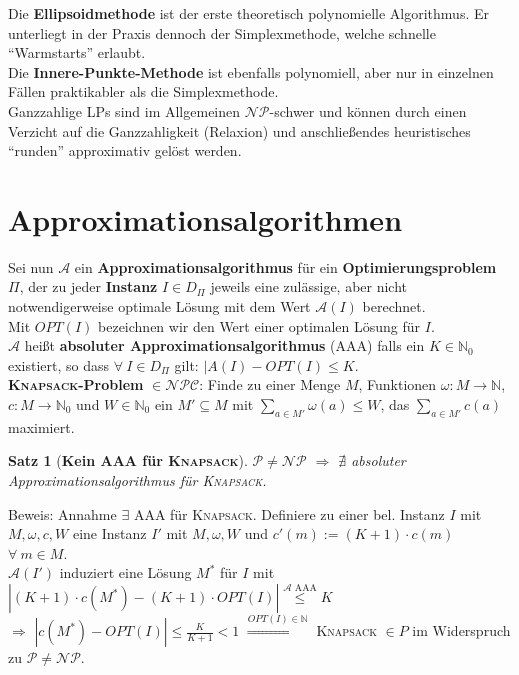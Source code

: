 \documentclass[a4paper,10pt]{scrartcl}
\newcommand{\tbf}{\textbf}
\newcommand{\tsc}{\textsc}
\newcommand{\Ra}{\Rightarrow}
\newcommand{\nat}{\mathbb{N}}
\newcommand{\natn}{\mathbb{N}_0}
\newcommand{\NP}{\mathcal{NP}}
\newcommand{\NPC}{\mathcal{NPC}}
\newcommand{\calA}{\mathcal{A}}
\newcommand{\calP}{\mathcal{P}}
\newtheorem{satz}{Satz}
\begin{document}
Die \tbf{Ellipsoidmethode} ist der erste theoretisch polynomielle Algorithmus. Er unterliegt in der Praxis dennoch der Simplexmethode, welche schnelle ``Warmstarts'' erlaubt. \\

Die \tbf{Innere-Punkte-Methode} ist ebenfalls polynomiell, aber nur in einzelnen Fällen praktikabler als die Simplexmethode. \\

Ganzzahlige LPs sind im Allgemeinen $\NP$-schwer und können durch einen Verzicht auf die Ganzzahligkeit (Relaxion) und anschließendes heuristisches ``runden'' approximativ gelöst werden. \\


\newpage
\section{Approximationsalgorithmen}
Sei nun $\calA$ ein \tbf{Approximationsalgorithmus} für ein \tbf{Optimierungsproblem} $\Pi$, der zu jeder \tbf{Instanz} $I \in D_\Pi$ jeweils eine zulässige, aber nicht notwendigerweise optimale Lösung mit dem Wert $\calA(I)$ berechnet. \\

Mit $OPT(I)$ bezeichnen wir den Wert einer optimalen Lösung für $I$. \\

$\calA$ heißt \tbf{absoluter Approximationsalgorithmus} (AAA) falls ein $K \in \natn$ existiert, so dass $\forall \ I \in D_\Pi$ gilt: $|A(I) - OPT(I) \leq K$. \\

\tbf{\tsc{Knapsack}-Problem} $\in \NPC$: Finde zu einer Menge $M$, Funktionen $\omega: M \rightarrow \nat$, $c: M \rightarrow \natn$ und $W \in \natn$ ein $M' \subseteq M$ mit $\sum_{a \in M'} \limits \omega(a) \leq W$, das $\sum_{a \in M'} \limits c(a)$ maximiert. \\

\begin{satz}[\tbf{Kein AAA für \tsc{Knapsack}}]
 $\calP \not = \NP$ $\Ra$ $\nexists$ absoluter Approximationsalgorithmus für \tsc{Knapsack}.
\end{satz}

Beweis: Annahme $\exists$ AAA für \tsc{Knapsack}. Definiere zu einer bel. Instanz $I$ mit $M, \omega, c, W$ eine Instanz $I'$ mit $M, \omega, W$ und $c'(m) := (K + 1) \cdot c(m)$ $\forall \ m \in M$. \\ 
$\calA(I')$ induziert eine Lösung $M^*$ für $I$ mit $|(K + 1) \cdot c(M^*) - (K + 1) \cdot OPT(I)| \overset{\calA \text{ AAA}}{\leq} K$ \\ $\Ra$ $|c(M^*) - OPT(I)| \leq \frac{K}{K + 1} < 1$ $\overset{OPT(I) \in \nat}{\Longrightarrow}$ \tsc{Knapsack} $\in P$ im Widerspruch zu $\calP \not = \NP$. \\
\end{document}
